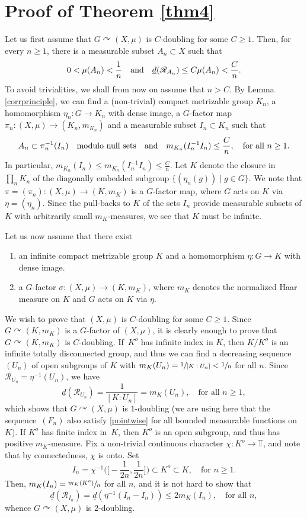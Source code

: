 \documentclass[10pt]{amsart}
\let\mathcal\mathscr
\newcommand{\cR}{\mathcal{R}}
\newcommand{\bT}{\mathbb{T}}
\newcommand{\qand}{\quad\textup{and}\quad}
\let\acts\curvearrowright
\theoremstyle{plain}
\theoremstyle{definition}
\begin{document}
\section{Proof of Theorem \ref{thm4}}

Let us first assume that $G \acts (X,\mu)$ is $C$\nobreakdash-doubling for some $C \geq 1$. Then, for every $n \geq 1$, there is
a measurable subset $A_n \subset X$ such that
\[
0 < \mu(A_n) < \frac{1}{n} \qand \underline{d}(\cR_{A_n}) \leq C\mu(A_n) < \frac{C}{n}.
\]
To avoid trivialities, we shall from now on assume that $n > C$. By Lemma \ref{corrprinciple}, we can find a (non-trivial) compact metrizable
group $K_n$, a homomorphism $\eta_n : G \to K_n$ with dense image, a $G$-factor map $\pi_n : (X,\mu) \to (K_n,m_{K_n})$ and
a measurable subset $I_n \subset K_n$ such that
\[
A_n \subset \pi_n^{-1}(I_n) \quad \textrm{modulo null sets} \qand m_{K_n}(I_n^{-1} I_n) \leq \frac{C}{n}, \quad \textrm{for all $n \geq 1$}.
\]
In particular, $m_{K_n}(I_n) \leq m_{K_n}(I_n^{-1} I_n) \leq \frac{C}{n}$. Let $K$ denote the closure in $\prod_n K_n$ of the diagonally embedded
subgroup $\{ (\eta_n(g)) \mid  g \in G\}$. We note that $\pi = (\pi_n) : (X,\mu) \to (K,m_K)$ is a $G$-factor map, where $G$
acts on $K$ via $\eta = (\eta_n)$. Since the pull-backs to $K$ of the sets $I_n$ provide measurable subsets of $K$ with arbitrarily small $m_K$-measures, we see that $K$ must be infinite.

Let us now assume that there exist
\begin{enumerate}
\item
an infinite compact metrizable group $K$ and a homomorphism $\eta : G \to K$ with dense image.
\item
a $G$-factor $\sigma : (X,\mu) \to (K,m_K)$, where $m_K$ denotes the normalized Haar measure on $K$
and $G$ acts on $K$ via $\eta$.
\end{enumerate}
We wish to prove that $(X,\mu)$ is $C$\nobreakdash-doubling for some $C \geq 1$. Since $G \acts (K,m_K)$ is a $G$-factor of $(X,\mu)$, it is clearly
enough to prove that $G \acts (K,m_K)$ is $C$\nobreakdash-doubling. If~$K^o$ has infinite index in $K$, then $K/K^o$ is an infinite totally disconnected group,
and thus we can find a decreasing sequence $(U_n)$ of open subgroups of $K$ with $m_K(U_n) = \sfrac{1}{[K : U_n]} < \sfrac{1}{n}$ for all $n$.
Since $\cR_{U_n} = \eta^{-1}(U_n)$, we have
\[
\underline{d}(\cR_{U_n}) = \frac{1}{[K : U_n]} = m_K(U_n), \quad \textrm{for all $n \geq 1$},
\]
which shows that $G \acts (X,\mu)$ is $1$\nobreakdash-doubling (we are using here that the sequence~$(F_n)$ also satisfy \eqref{pointwise} for all bounded
measurable functions on $K$). If $K^o$ has finite index in~$K$, then $K^o$ is an open subgroup, and thus has
positive $m_K$-measure. Fix a non-trivial continuous character $\chi : K^o \to \bT$, and note that by connectedness, $\chi$ is onto. Set
\[
I_n = \chi^{-1}\Big(\Big[-\frac{1}{2n},\frac{1}{2n}\Big]\Big) \subset K^o \subset K, \quad \textrm{for $n \geq 1$}.
\]
Then, $m_K(I_n) = \sfrac{m_K(K^o)}{n}$ for all $n$, and it is not hard to show that
\[
\underline{d}(\cR_{I_n}) = \underline{d}(\eta^{-1}(I_n - I_n)) \leq 2 m_K(I_n), \quad \textrm{for all $n$},
\]
whence $G \acts (X,\mu)$ is $2$\nobreakdash-doubling.
\end{document}
